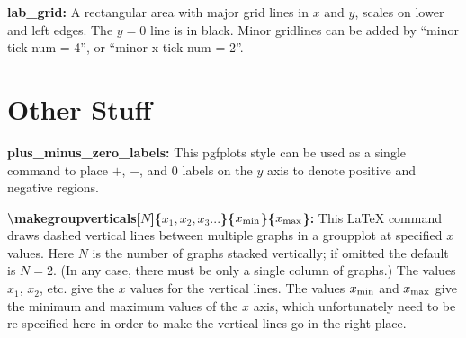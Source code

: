 \documentclass{article}
\begin{document}
\textbf{lab\_grid:} A rectangular area with major grid lines in $x$ and $y$, scales on lower and left edges.  The $y=0$ line is in black.  Minor gridlines can be added by ``minor tick num = 4'', or ``minor x tick num = 2''. 

\section{Other Stuff}

\textbf{plus\_minus\_zero\_labels:} This pgfplots style can be used as a single command to place $+$, $-$, and $0$ labels on the $y$ axis to denote positive and negative regions.

\textbf{\textbackslash makegroupverticals[$N$]\{$x_1, x_2, x_3...$\}\{$x_{\rm min}$\}\{$x_{\rm max}$\}:} This LaTeX command draws dashed vertical lines between multiple graphs in a groupplot at specified $x$ values.  Here $N$ is the number of graphs stacked vertically; if omitted the default is $N=2$. (In any case, there must be only a single column of graphs.)  The values $x_1$, $x_2$, etc. give the $x$ values for the vertical lines.  The values $x_{\rm min}$ and $x_{\rm max}$ give the minimum and maximum values of the $x$ axis, which unfortunately need to be re-specified here in order to make the vertical lines go in the right place.
\end{document}
